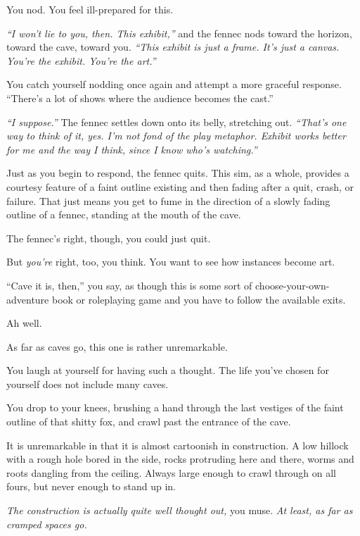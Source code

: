 You nod. You feel ill-prepared for this.

\emph{``I won't lie to you, then. This exhibit,''} and the fennec nods toward the horizon, toward the cave, toward you. \emph{``This exhibit is just a frame. It's just a canvas. You're the exhibit. You're the art.''}

You catch yourself nodding once again and attempt a more graceful response. ``There's a lot of shows where the audience becomes the cast.''

\emph{``I suppose.''} The fennec settles down onto its belly, stretching out. \emph{``That's one way to think of it, yes. I'm not fond of the play metaphor. Exhibit works better for me and the way I think, since I know who's watching.''}

Just as you begin to respond, the fennec quits. This sim, as a whole, provides a courtesy feature of a faint outline existing and then fading after a quit, crash, or failure. That just means you get to fume in the direction of a slowly fading outline of a fennec, standing at the mouth of the cave.

The fennec's right, though, you could just quit.

But \emph{you're} right, too, you think. You want to see how instances become art.

``Cave it is, then,'' you say, as though this is some sort of choose-your-own-adventure book or roleplaying game and you have to follow the available exits.

Ah well.


As far as caves go, this one is rather unremarkable.

You laugh at yourself for having such a thought. The life you've chosen for yourself does not include many caves.

You drop to your knees, brushing a hand through the last vestiges of the faint outline of that shitty fox, and crawl past the entrance of the cave.

It is unremarkable in that it is almost cartoonish in construction. A low hillock with a rough hole bored in the side, rocks protruding here and there, worms and roots dangling from the ceiling. Always large enough to crawl through on all fours, but never enough to stand up in.

\emph{The construction is actually quite well thought out,} you muse. \emph{At least, as far as cramped spaces go.}


